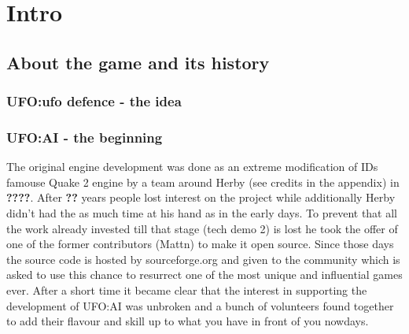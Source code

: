 
%
%


\chapter{Intro}

\section{About the game and its history}

\subsection{UFO:ufo defence - the idea}

\subsection{UFO:AI - the beginning}
The original engine development was done as an extreme modification of IDs famouse Quake 2 engine by a team around Herby (see credits in the appendix) in \textbf{????}. After \textbf{??} years people lost interest on the project while additionally Herby didn't had the as much time at his hand as in the early days.
To prevent that all the work already invested till that stage (tech demo 2) is lost he took the offer of one of the former contributors (Mattn) to make it open source.  Since those days the source code is hosted by sourceforge.org and given to the community which is asked to use this chance to resurrect one of the most unique and influential games ever. After a short time it became clear that the interest in supporting the development of UFO:AI was unbroken and a bunch of volunteers found together to add their flavour and skill up to what you have in front of you nowdays.

